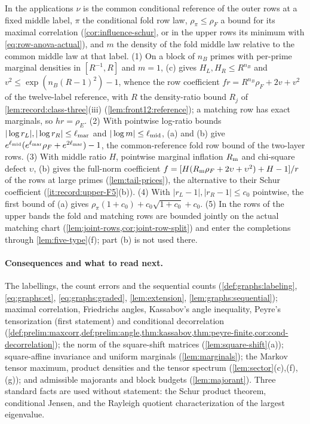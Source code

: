 \begin{remark}[Instances]\label{rem:row-comparison-uses}
In the applications $\nu$ is the common conditional reference of the outer rows
at a fixed middle label, $\pi$ the conditional fold row law, $\rho_\pi\le\rho_F$
a bound for its maximal correlation (\cref{cor:influence-schur}, or in the upper
rows its minimum with \eqref{eq:row-anova-actual}), and $m$ the density of the
fold middle law relative to the common middle law at that label. (1) On a block
of $n_B$ primes with per-prime marginal densities in $[R^{-1},R]$ and $m=1$, (c)
gives $H_L,H_R\le R^{n_B}$ and $v^2\le\exp(n_B(R-1)^2)-1$, whence the row
coefficient $fr=R^{n_B}\rho_F+2v+v^2$ of the twelve-label reference, with $R$ the
density-ratio bound $R_j$ of \cref{lem:record:class-three}(iii)
(\cref{lem:front12:reference}); a matching row has exact marginals, so
$hr=\rho_E$. (2) With pointwise log-ratio bounds
$|\log r_L|,|\log r_R|\le\ell_{\rm mar}$ and $|\log m|\le\ell_{\rm mid}$, (a)
and (b) give $e^{\ell_{\rm mid}}(e^{\ell_{\rm mar}}\rho_F+e^{2\ell_{\rm mar}})-1$,
the common-reference fold row bound of the two-layer rows. (3) With middle ratio
$H$, pointwise marginal inflation $R_{\rm m}$ and chi-square defect $\upsilon$,
(b) gives the full-norm coefficient
$f=[H(R_{\rm m}\rho_F+2\upsilon+\upsilon^2)+H-1]/r$ of the rows
at large primes (\cref{lem:tail-prices}), the alternative to their
Schur coefficient (\ref{it:record:upper-F5}(b)).
(4) With $|r_L-1|,|r_R-1|\le c_0$
pointwise, the first bound of (a) gives $\rho_\pi(1+c_0)+c_0\sqrt{1+c_0}+c_0$.
(5) In the rows of the upper bands the fold and matching rows are bounded
jointly on the actual matching chart (\cref{lem:joint-rows,cor:joint-row-split})
and enter the completions through \cref{lem:five-type}(f); part (b) is not used
there.
\end{remark}

\paragraph{Consequences and what to read next.}
The labellings, the count errors and the sequential counts
(\cref{def:graphs:labeling}, \eqref{eq:graphs:et}, \eqref{eq:graphs:graded},
\cref{lem:extension}, \cref{lem:graphs:sequential}); maximal correlation,
Friedrichs angles, Kassabov's angle inequality, Peyre's tensorization (first
statement) and conditional decorrelation
(\cref{def:prelim:maxcorr,def:prelim:angle,thm:kassabov,thm:peyre-finite,cor:cond-decorrelation});
the norm of the square-shift matrices (\cref{lem:square-shift}(a));
square-affine invariance and uniform marginals (\cref{lem:marginals}); the
Markov tensor maximum, product densities and the tensor spectrum
(\cref{lem:sector}(c),(f),(g)); and admissible majorants and block budgets
(\cref{lem:majorant}). Three standard facts are used without statement: the
Schur product theorem, conditional Jensen, and the Rayleigh quotient
characterization of the largest eigenvalue.
